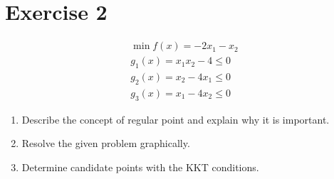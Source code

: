\documentclass[\main/main.tex]{subfiles}
\begin{document}
\section{Exercise 2}

\begin{align*}
  \min f(x) = -2x_1 -x_2     \\
  g_1(x) = x_1x_2 - 4 \leq 0 \\
  g_2(x) = x_2 - 4x_1 \leq 0 \\
  g_3(x) = x_1 - 4x_2 \leq 0
\end{align*}

\begin{enumerate}
  \item Describe the concept of regular point and explain why it is important.
  \item Resolve the given problem graphically.
  \item Determine candidate points with the KKT conditions.
\end{enumerate}
\end{document}
